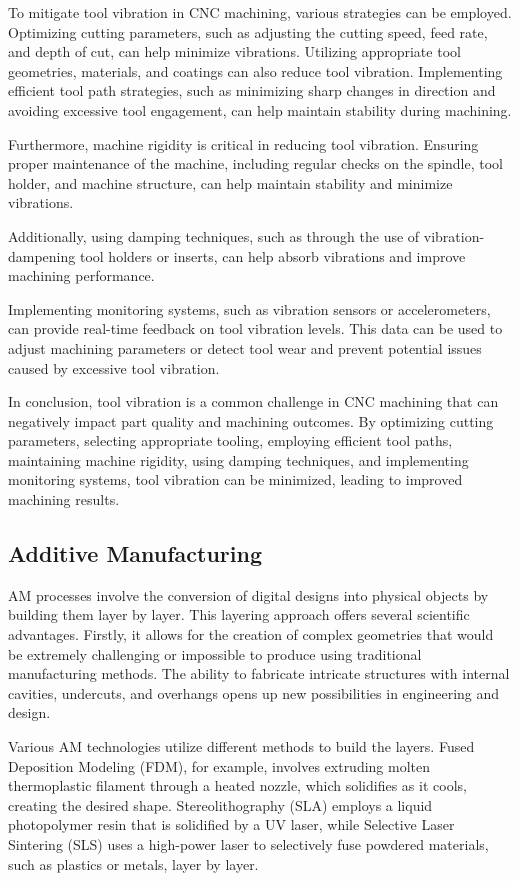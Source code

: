 To mitigate tool vibration in CNC machining, various strategies can be employed. Optimizing cutting parameters, such as adjusting the cutting speed, feed rate, and depth of cut, can help minimize vibrations. Utilizing appropriate tool geometries, materials, and coatings can also reduce tool vibration. Implementing efficient tool path strategies, such as minimizing sharp changes in direction and avoiding excessive tool engagement, can help maintain stability during machining.

Furthermore, machine rigidity is critical in reducing tool vibration. Ensuring proper maintenance of the machine, including regular checks on the spindle, tool holder, and machine structure, can help maintain stability and minimize vibrations.

Additionally, using damping techniques, such as through the use of vibration-dampening tool holders or inserts, can help absorb vibrations and improve machining performance.

Implementing monitoring systems, such as vibration sensors or accelerometers, can provide real-time feedback on tool vibration levels. This data can be used to adjust machining parameters or detect tool wear and prevent potential issues caused by excessive tool vibration.

In conclusion, tool vibration is a common challenge in CNC machining that can negatively impact part quality and machining outcomes. By optimizing cutting parameters, selecting appropriate tooling, employing efficient tool paths, maintaining machine rigidity, using damping techniques, and implementing monitoring systems, tool vibration can be minimized, leading to improved machining results.

\subsection{Additive Manufacturing}
AM processes involve the conversion of digital designs into physical objects by building them layer by layer. This layering approach offers several scientific advantages. Firstly, it allows for the creation of complex geometries that would be extremely challenging or impossible to produce using traditional manufacturing methods. The ability to fabricate intricate structures with internal cavities, undercuts, and overhangs opens up new possibilities in engineering and design.

Various AM technologies utilize different methods to build the layers. Fused Deposition Modeling (FDM), for example, involves extruding molten thermoplastic filament through a heated nozzle, which solidifies as it cools, creating the desired shape. Stereolithography (SLA) employs a liquid photopolymer resin that is solidified by a UV laser, while Selective Laser Sintering (SLS) uses a high-power laser to selectively fuse powdered materials, such as plastics or metals, layer by layer.

